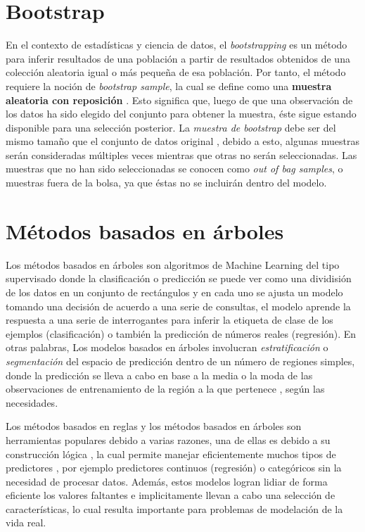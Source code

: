 \section{Bootstrap}
En el contexto de estadísticas y ciencia de datos, el \textit{bootstrapping} es un método para inferir resultados
de una población a partir de resultados obtenidos de una colección aleatoria igual o más pequeña de esa población. Por tanto, 
el método requiere la noción de \textit{bootstrap sample}, la cual se define como una \textbf{muestra aleatoria con reposición}
\cite{17}. Esto significa que, luego de que una observación de los datos ha sido elegido del conjunto para obtener la muestra, éste sigue 
estando disponible para una selección posterior. La \textit{muestra de bootstrap} debe ser del mismo tamaño que el conjunto de datos original \cite{18}, debido a esto, 
algunas muestras serán consideradas múltiples veces mientras que otras no serán seleccionadas. Las muestras que no han sido seleccionadas 
se conocen como \textit{out of bag samples}, o muestras fuera de la bolsa, ya que éstas no se incluirán dentro del modelo.

%
%
%
%
\section{Métodos basados en árboles}

Los métodos basados en árboles son algoritmos de Machine Learning del tipo supervisado donde la  
clasificación o predicción se puede ver como una dividisión de los datos en un conjunto de rectángulos \cite{13} y en
cada uno se ajusta un modelo tomando una decisión de acuerdo a una serie de consultas, el modelo
aprende la respuesta a una serie de interrogantes para inferir la etiqueta de clase de los
ejemplos (clasificación) o también la predicción de números reales (regresión). En otras palabras, 
Los modelos basados en árboles involucran \textit{estratificación} o \textit{segmentación} del 
espacio de predicción dentro de un número de regiones simples, donde la predicción se lleva a cabo 
en base a la media o la moda de las observaciones de entrenamiento de la región a la que pertenece \cite{14}, según las necesidades.

Los métodos basados en reglas y los métodos basados en árboles son herramientas populares debido a varias razones,
una de ellas es debido a su construcción lógica \cite{18}, la cual permite manejar eficientemente muchos tipos de predictores
, por ejemplo predictores continuos (regresión) o categóricos sin la necesidad de procesar datos. Además,
estos modelos logran lidiar de forma eficiente los valores faltantes e implicitamente llevan a cabo una selección de características,
lo cual resulta importante para problemas de modelación de la vida real.

